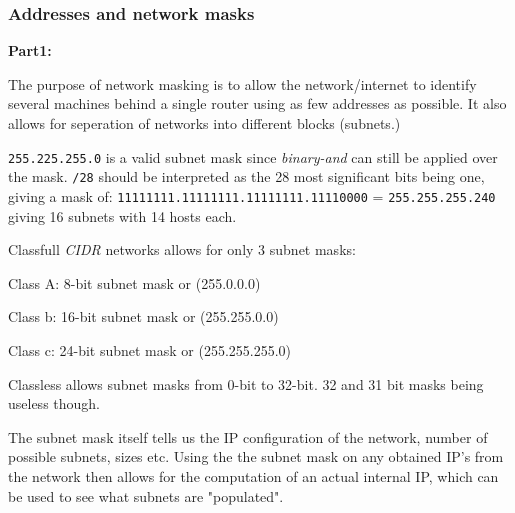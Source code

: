 \documentclass[10pt]{article}
\begin{document}
\subsubsection{Addresses and network masks}
\textbf{Part1:}\\
\begin{enumerate*}
  \item The purpose of network masking is to allow the network/internet to
        identify several machines behind a single router using as few addresses
        as possible. It also allows for seperation of networks into different
        blocks (subnets.)
  \item \texttt{255.225.255.0} is a valid subnet mask since \textit{binary-and}
        can still be applied over the mask. \texttt{/28} should be interpreted
        as the 28 most significant bits being one, giving a mask of:
        \texttt{11111111.11111111.11111111.11110000} = \texttt{255.255.255.240}
        giving 16 subnets with 14 hosts each.
  \item Classfull \textit{CIDR} networks allows for only 3 subnet masks:
        \begin{itemize*}
          \item Class A: 8-bit subnet mask or (255.0.0.0)
          \item Class b: 16-bit subnet mask or (255.255.0.0)
          \item Class c: 24-bit subnet mask or (255.255.255.0)
        \end{itemize*}
        Classless allows subnet masks from 0-bit to 32-bit. 32 and 31 bit masks
        being useless though.
  \item The subnet mask itself tells us the IP configuration of the network,
        number of possible subnets, sizes etc. Using the the subnet mask on any
        obtained IP's from the network then allows for the computation of an
        actual internal IP, which can be used to see what subnets are
        "populated".
\end{enumerate*}
\end{document}
